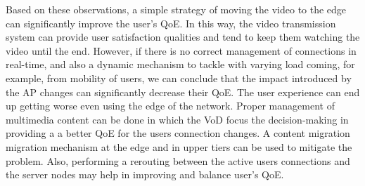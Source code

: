 Based on these observations,
a simple strategy of moving the video to the edge can significantly improve the user's QoE. In this way, the video transmission system can provide user satisfaction qualities and tend to keep them watching the video until the end. However, if there is no correct management of connections in real-time, and also a dynamic mechanism to tackle with varying load coming, for example, from mobility of users, we can conclude that the impact introduced by the AP changes can significantly decrease their QoE. The user experience can end up getting worse even using the edge of the network. Proper management of multimedia content can be done in which the VoD focus the decision-making in providing a a better QoE for the users connection changes. A content migration migration mechanism at the edge and in upper tiers can be used to mitigate the problem. Also, performing a rerouting between the active users connections and the server nodes may help in improving and balance user's QoE.

